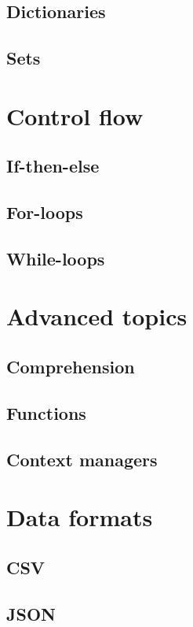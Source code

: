\subsection{Dictionaries}
\subsection{Sets}

\section{Control flow}

\subsection{If-then-else}
\subsection{For-loops}
\subsection{While-loops}

\section{Advanced topics}

\subsection{Comprehension}
\subsection{Functions}
\subsection{Context managers}


\section{Data formats}

\subsection{CSV}

\subsection{JSON}

